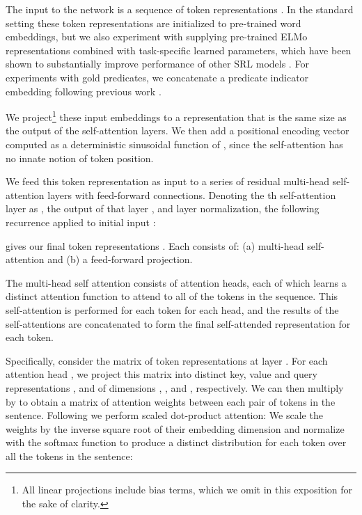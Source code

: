 \documentclass[11pt,a4paper]{article}
\begin{document}
The input to the network is a sequence  of  token representations . In the standard setting these token representations are initialized to pre-trained word embeddings, but we also experiment with supplying pre-trained ELMo representations combined with task-specific learned parameters, which have been shown to substantially improve performance of other SRL models \citep{peters2018deep}.
For experiments with gold predicates, we concatenate a predicate indicator embedding  following previous work \citep{he2017deep}.


We project\footnote{All linear projections include bias terms, which we omit in this exposition for the sake of clarity.} these input embeddings to a representation that is the same size as the output of the self-attention layers. We then add a positional encoding vector computed as a deterministic sinusoidal function of , since the self-attention has no innate notion of token position. 









We feed this token representation as input to a series of  residual multi-head self-attention layers with feed-forward connections. Denoting the th self-attention layer as , the output of that layer , and  layer normalization, the following recurrence applied to initial input :

gives our final token representations . Each  consists of: (a) multi-head self-attention and (b) a feed-forward projection.

The multi-head self attention consists of  attention heads, each of which learns a distinct attention function to attend to all of the tokens in the sequence. This self-attention is performed for each token for each head, and the results of the  self-attentions are concatenated to form the final self-attended representation for each token. 

Specifically, consider the matrix  of  token representations at layer . For each attention head , we project this matrix into distinct key, value and query representations ,  and  of dimensions , , and , respectively. We can then multiply  by  to obtain a  matrix of attention weights  between each pair of tokens in the sentence. Following \citet{vaswani2017attention} we perform scaled dot-product attention: We scale the weights by the inverse square root of their embedding dimension and normalize with the softmax function to produce a distinct distribution for each token over all the tokens in the sentence:
\end{document}
